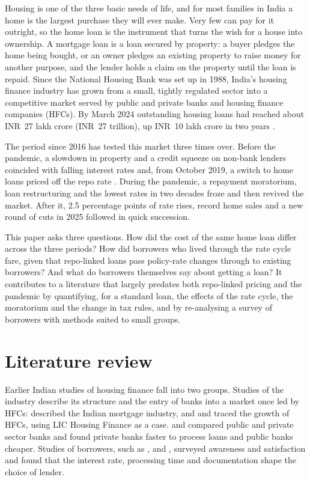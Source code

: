 \documentclass[sn-basic]{sn-jnl}
\newcommand{\INR}{INR~}
\begin{document}
Housing is one of the three basic needs of life, and for most families in India a home is the largest purchase they will ever make. Very few can pay for it outright, so the home loan is the instrument that turns the wish for a house into ownership. A mortgage loan is a loan secured by property: a buyer pledges the home being bought, or an owner pledges an existing property to raise money for another purpose, and the lender holds a claim on the property until the loan is repaid. Since the National Housing Bank was set up in 1988, India's housing finance industry has grown from a small, tightly regulated sector into a competitive market served by public and private banks and housing finance companies (HFCs). By March 2024 outstanding housing loans had reached about \INR 27 lakh crore (\INR 27 trillion), up \INR 10 lakh crore in two years \citep{outlook2024}.

The period since 2016 has tested this market three times over. Before the pandemic, a slowdown in property and a credit squeeze on non-bank lenders coincided with falling interest rates and, from October 2019, a switch to home loans priced off the repo rate \citep{rbi2019eblr}. During the pandemic, a repayment moratorium, loan restructuring and the lowest rates in two decades froze and then revived the market. After it, 2.5 percentage points of rate rises, record home sales and a new round of cuts in 2025 followed in quick succession.

This paper asks three questions. How did the cost of the same home loan differ across the three periods? How did borrowers who lived through the rate cycle fare, given that repo-linked loans pass policy-rate changes through to existing borrowers? And what do borrowers themselves say about getting a loan? It contributes to a literature that largely predates both repo-linked pricing and the pandemic by quantifying, for a standard loan, the effects of the rate cycle, the moratorium and the change in tax rules, and by re-analysing a survey of borrowers with methods suited to small groups.

\section{Literature review}\label{sec:lit}

Earlier Indian studies of housing finance fall into two groups. Studies of the industry describe its structure and the entry of banks into a market once led by HFCs: \citet{kotireddy2011} described the Indian mortgage industry, and \citet{vikkraman2004} and \citet{dhanija2015} traced the growth of HFCs, using LIC Housing Finance as a case. \citet{sangwan2012} and \citet{chauhan2017} compared public and private sector banks and found private banks faster to process loans and public banks cheaper. Studies of borrowers, such as \citet{nazrine2017}, \citet{nalluswamy2012} and \citet{verma2015}, surveyed awareness and satisfaction and found that the interest rate, processing time and documentation shape the choice of lender.
\end{document}
